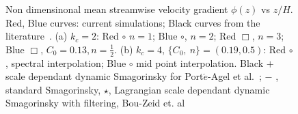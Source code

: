 \begin{figure}
\begin{subfigure}[t]{0.5\textwidth}
        \end{subfigure}%
        \caption[$\Phi(z)$: interpolation, $C_0$]{Non dimensinonal mean streamwise velocity gradient $\phi(z)$ vs $z/H$. Red, Blue curves: current simulations; Black curves from the literature~\cite{porte1fun,bou1}. (a) $k_{c}=2$: Red $\circ$ $n = 1$; Blue $\circ$, $n = 2$; Red $\Box$, $n = 3$; Blue $\Box$, $C_0 = 0.13, n = \frac{1}{2}$.  (b) $k_c = 4$, $\lbrace C_0, \ n\rbrace = (0.19, 0.5)$: Red $\circ$ , spectral interpolation; Blue $\circ$ mid point interpolation. Black $+$ scale dependant dynamic Smagorinsky for Port$\acute{e}$-Agel et al.~\cite{porte1fun}; $-$ , standard Smagorinsky, $\star$, Lagrangian scale dependant dynamic Smagorinsky with filtering, Bou-Zeid et. al~\cite{bou1}}\label{fig:stat0_lotw}
\end{figure}

